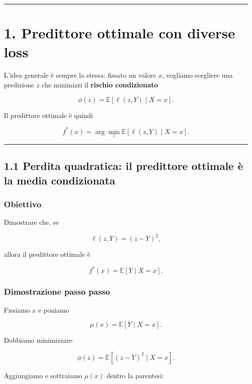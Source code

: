 \documentclass[
]{article}
\begin{document}
\begin{center}\rule{0.5\linewidth}{0.5pt}\end{center}

\section{1. Predittore ottimale con diverse
loss}\label{predittore-ottimale-con-diverse-loss}

L'idea generale è sempre la stessa: fissato un valore \(x\), vogliamo
scegliere una predizione \(z\) che minimizzi il \textbf{rischio
condizionato}

\[
\phi(z) = \mathbb{E}[\ell(z,Y)\mid X=x].
\]

Il predittore ottimale è quindi

\[
f^*(x) = \arg\min_z \mathbb{E}[\ell(z,Y)\mid X=x].
\]

\begin{center}\rule{0.5\linewidth}{0.5pt}\end{center}

\subsection{1.1 Perdita quadratica: il predittore ottimale è la media
condizionata}\label{perdita-quadratica-il-predittore-ottimale-uxe8-la-media-condizionata}

\subsubsection{Obiettivo}\label{obiettivo}

Dimostrare che, se

\[
\ell(z,Y)=(z-Y)^2,
\]

allora il predittore ottimale è

\[
f^*(x)=\mathbb{E}[Y\mid X=x].
\]

\subsubsection{Dimostrazione passo
passo}\label{dimostrazione-passo-passo}

Fissiamo \(x\) e poniamo

\[
\mu(x)=\mathbb{E}[Y\mid X=x].
\]

Dobbiamo minimizzare

\[
\phi(z)=\mathbb{E}[(z-Y)^2\mid X=x].
\]

Aggiungiamo e sottraiamo \(\mu(x)\) dentro la parentesi:
\end{document}
